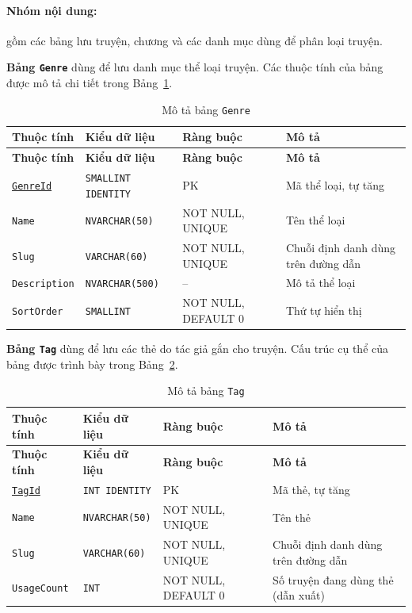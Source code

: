 \paragraph{Nhóm nội dung:} gồm các bảng lưu truyện, chương và các danh mục dùng để phân loại truyện.

\textbf{Bảng \texttt{Genre}} dùng để lưu danh mục thể loại truyện. Các thuộc tính của bảng được mô tả chi tiết trong Bảng~\ref{tab:db-genre}.


{\small
\renewcommand{\arraystretch}{1.2}
\begin{longtable}{|>{\raggedright\arraybackslash}p{3.1cm}|>{\raggedright\arraybackslash}p{2.7cm}|>{\raggedright\arraybackslash}p{4.0cm}|>{\raggedright\arraybackslash}p{5.4cm}|}
\caption{Mô tả bảng \texttt{Genre}}\label{tab:db-genre}\\
\hline
\textbf{Thuộc tính} & \textbf{Kiểu dữ liệu} & \textbf{Ràng buộc} & \textbf{Mô tả} \\ \hline
\endfirsthead
\hline
\textbf{Thuộc tính} & \textbf{Kiểu dữ liệu} & \textbf{Ràng buộc} & \textbf{Mô tả} \\ \hline
\endhead
\underline{\texttt{GenreId}} & \texttt{SMALLINT IDENTITY} & PK & Mã thể loại, tự tăng \\ \hline
\texttt{Name} & \texttt{NVARCHAR(50)} & NOT NULL, UNIQUE & Tên thể loại \\ \hline
\texttt{Slug} & \texttt{VARCHAR(60)} & NOT NULL, UNIQUE & Chuỗi định danh dùng trên đường dẫn \\ \hline
\texttt{Description} & \texttt{NVARCHAR(500)} & -- & Mô tả thể loại \\ \hline
\texttt{SortOrder} & \texttt{SMALLINT} & NOT NULL, DEFAULT 0 & Thứ tự hiển thị \\ \hline
\end{longtable}
}

\textbf{Bảng \texttt{Tag}} dùng để lưu các thẻ do tác giả gắn cho truyện. Cấu trúc cụ thể của bảng được trình bày trong Bảng~\ref{tab:db-tag}.


{\small
\renewcommand{\arraystretch}{1.2}
\begin{longtable}{|>{\raggedright\arraybackslash}p{3.1cm}|>{\raggedright\arraybackslash}p{2.7cm}|>{\raggedright\arraybackslash}p{4.0cm}|>{\raggedright\arraybackslash}p{5.4cm}|}
\caption{Mô tả bảng \texttt{Tag}}\label{tab:db-tag}\\
\hline
\textbf{Thuộc tính} & \textbf{Kiểu dữ liệu} & \textbf{Ràng buộc} & \textbf{Mô tả} \\ \hline
\endfirsthead
\hline
\textbf{Thuộc tính} & \textbf{Kiểu dữ liệu} & \textbf{Ràng buộc} & \textbf{Mô tả} \\ \hline
\endhead
\underline{\texttt{TagId}} & \texttt{INT IDENTITY} & PK & Mã thẻ, tự tăng \\ \hline
\texttt{Name} & \texttt{NVARCHAR(50)} & NOT NULL, UNIQUE & Tên thẻ \\ \hline
\texttt{Slug} & \texttt{VARCHAR(60)} & NOT NULL, UNIQUE & Chuỗi định danh dùng trên đường dẫn \\ \hline
\texttt{UsageCount} & \texttt{INT} & NOT NULL, DEFAULT 0 & Số truyện đang dùng thẻ (dẫn xuất) \\ \hline
\end{longtable}
}

